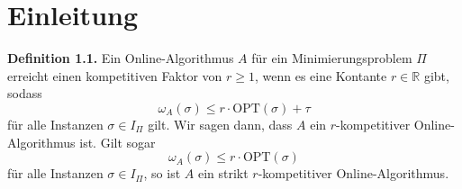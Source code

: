 \chapter{Einleitung}

\textbf{Definition 1.1.} Ein Online-Algorithmus $A$ für ein Minimierungsproblem $\Pi$ erreicht einen kompetitiven Faktor von $r \geq 1$, wenn es eine Kontante $r \in \mathbb{R}$ gibt, sodass $$\omega_A(\sigma) \leq r \cdot \textrm{OPT}(\sigma) + \tau$$ für alle Instanzen $\sigma \in I_\Pi$ gilt. Wir sagen dann, dass $A$ ein $r$-kompetitiver Online-Algorithmus ist. Gilt sogar $$\omega_A(\sigma) \leq r \cdot \textrm{OPT}(\sigma)$$ für alle Instanzen $\sigma \in I_\Pi$, so ist $A$ ein strikt $r$-kompetitiver Online-Algorithmus.
